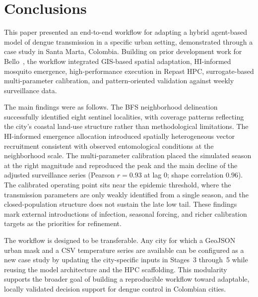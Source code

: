 \documentclass[applsci,article,accept,pdftex,moreauthors]{Definitions/mdpi}
\begin{document}
\section{Conclusions}
\label{sec:conclusions}

This paper presented an end-to-end workflow for adapting a hybrid agent-based model of dengue transmission in a specific urban setting, demonstrated through a case study in Santa Marta, Colombia. Building on prior development work for Bello~\cite{escudero2023hybrid,uribe2023ccc}, the workflow integrated GIS-based spatial adaptation, HI-informed mosquito emergence, high-performance execution in Repast HPC, surrogate-based multi-parameter calibration, and pattern-oriented validation against weekly surveillance data.

The main findings were as follows. The BFS neighborhood delineation successfully identified eight sentinel localities, with coverage patterns reflecting the city's coastal land-use structure rather than methodological limitations. The HI-informed emergence allocation introduced spatially heterogeneous vector recruitment consistent with observed entomological conditions at the neighborhood scale. The multi-parameter calibration placed the simulated season at the right magnitude and reproduced the peak and the main decline of the adjusted surveillance series (Pearson $r = 0.93$ at lag 0; shape correlation $0.96$). The calibrated operating point sits near the epidemic threshold, where the transmission parameters are only weakly identified from a single season, and the closed-population structure does not sustain the late low tail. These findings mark external introductions of infection, seasonal forcing, and richer calibration targets as the priorities for refinement.

The workflow is designed to be transferable. Any city for which a GeoJSON urban mask and a CSV temperature series are available can be configured as a new case study by updating the city-specific inputs in Stages~3 through~5 while reusing the model architecture and the HPC scaffolding. This modularity supports the broader goal of building a reproducible workflow toward adaptable, locally validated decision support for dengue control in Colombian cities.

\end{document}
